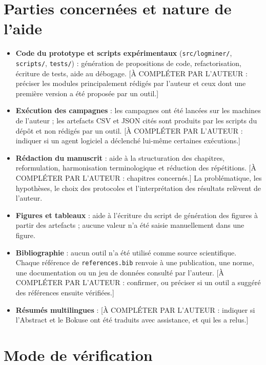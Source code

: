 \section*{Parties concernées et nature de l'aide}

\begin{itemize}
  \item \textbf{Code du prototype et scripts expérimentaux}
  (\texttt{src/logminer/}, \texttt{scripts/}, \texttt{tests/}) : génération de
  propositions de code, refactorisation, écriture de tests, aide au
  débogage. [À COMPLÉTER PAR L'AUTEUR : préciser les modules principalement
  rédigés par l'auteur et ceux dont une première version a été proposée par un
  outil.]

  \item \textbf{Exécution des campagnes} : les campagnes ont été lancées sur
  les machines de l'auteur ; les artefacts CSV et JSON cités sont produits par
  les scripts du dépôt et non rédigés par un outil. [À COMPLÉTER PAR
  L'AUTEUR : indiquer si un agent logiciel a déclenché lui-même certaines
  exécutions.]

  \item \textbf{Rédaction du manuscrit} : aide à la structuration des
  chapitres, reformulation, harmonisation terminologique et réduction des
  répétitions. [À COMPLÉTER PAR L'AUTEUR : chapitres concernés.] La
  problématique, les hypothèses, le choix des protocoles et l'interprétation
  des résultats relèvent de l'auteur.

  \item \textbf{Figures et tableaux} : aide à l'écriture du script de
  génération des figures à partir des artefacts ; aucune valeur n'a été
  saisie manuellement dans une figure.

  \item \textbf{Bibliographie} : aucun outil n'a été utilisé comme source
  scientifique. Chaque référence de \texttt{references.bib} renvoie à une
  publication, une norme, une documentation ou un jeu de données consulté par
  l'auteur. [À COMPLÉTER PAR L'AUTEUR : confirmer, ou préciser si un outil a
  suggéré des références ensuite vérifiées.]

  \item \textbf{Résumés multilingues} : [À COMPLÉTER PAR L'AUTEUR : indiquer
  si l'Abstract et le Bokuse ont été traduits avec assistance, et qui les a
  relus.]
\end{itemize}

\section*{Mode de vérification}

